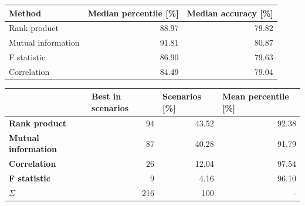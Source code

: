 \begin{table}[h]
\centering
\begin{tabular}{|l|r|r|}
\hline
\textbf{Method}    & \multicolumn{1}{l|}{\textbf{Median percentile {[}\%{]}}} & \multicolumn{1}{l|}{\textbf{Median accuracy {[}\%{]}}} \\ \hline
Rank product       & 88.97                                                    & 79.82                                                 \\ \hline
Mutual information & 91.81                                                    & 80.87                                                 \\ \hline
F statistic        & 86.90                                                    & 79.63                                                 \\ \hline
Correlation        & 84.49                                                    & 79.04                                                  \\ \hline
\end{tabular}
\end{table}

\begin{table}[h]
\centering
\begin{tabular}{|l|r|r|r|}
\hline
                            & \multicolumn{1}{l|}{\textbf{Best in scenarios}} & \multicolumn{1}{l|}{\textbf{Scenarios {[}\%{]}}} & \multicolumn{1}{l|}{\textbf{Mean percentile {[}\%{]}}} \\ \hline
\textbf{Rank product}       & 94                                                     & 43.52                                            & 92.38 \\ \hline
\textbf{Mutual information} & 87                                                      & 40.28                                            & 91.79 \\ \hline
\textbf{Correlation}        & 26                                                      & 12.04                                             & 97.54 \\ \hline
\textbf{F statistic}        & 9                                                       & 4.16                                             & 96.10 \\ \hline
\textbf{$\Sigma$}           & 216                                                     & 100                                       & -                                                      \\ \hline
\end{tabular}
\end{table}

